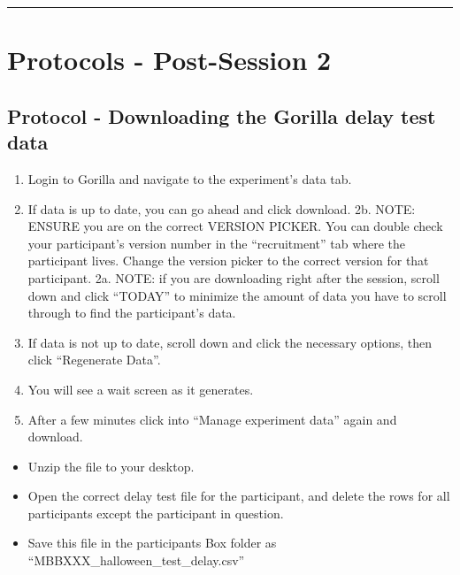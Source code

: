 \documentclass[]{book}
\providecommand{\tightlist}{%
  \setlength{\itemsep}{0pt}\setlength{\parskip}{0pt}}
\begin{document}
\begin{center}\rule{0.5\linewidth}{0.5pt}\end{center}

\hypertarget{protocols---post-session-2}{%
\section{Protocols - Post-Session 2}\label{protocols---post-session-2}}

\hypertarget{protocol---downloading-the-gorilla-delay-test-data}{%
\subsection{Protocol - Downloading the Gorilla delay test data}\label{protocol---downloading-the-gorilla-delay-test-data}}

\begin{enumerate}
\def\labelenumi{\arabic{enumi}.}
\tightlist
\item
  Login to Gorilla and navigate to the experiment's data tab.
\item
  If data is up to date, you can go ahead and click download.
  2b. NOTE: ENSURE you are on the correct VERSION PICKER. You can double check your participant's version number in the ``recruitment'' tab where the participant lives. Change the version picker to the correct version for that participant.
  2a. NOTE: if you are downloading right after the session, scroll down and click ``TODAY'' to minimize the amount of data you have to scroll through to find the participant's data.
\item
  If data is not up to date, scroll down and click the necessary options, then click ``Regenerate Data''.
\item
  You will see a wait screen as it generates.
\item
  After a few minutes click into ``Manage experiment data'' again and download.
\end{enumerate}

\begin{itemize}
\tightlist
\item
  Unzip the file to your desktop.
\item
  Open the correct delay test file for the participant, and delete the rows for all participants except the participant in question.
\item
  Save this file in the participants Box folder as ``MBBXXX\_halloween\_test\_delay.csv''
\end{itemize}
\end{document}
